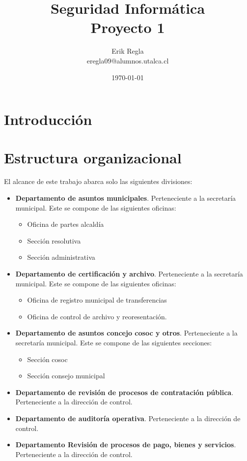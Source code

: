 \documentclass[11pt]{utalcaDoc}
\title{{\bf Seguridad Informática}\\ Proyecto 1}
\author{Erik Regla\\ eregla09@alumnos.utalca.cl}
\date{\today}
\begin{document}
\maketitle
\newpage

\section{Introducción}

\section{Estructura organizacional}
El alcance de este trabajo abarca solo las siguientes divisiones:
\begin{itemize}
	\item {
		\textbf{Departamento de asuntos municipales}. Perteneciente a la secretaría municipal. Este se compone de las siguientes oficinas:
		\begin{itemize}
			\item Oficina de partes alcaldía
			\item Sección resolutiva
			\item Sección administrativa
		\end{itemize}
	}
	\item {
		\textbf{Departamento de certificación y archivo}.  Perteneciente a la secretaría municipal. Este se compone de las siguientes oficinas:
		\begin{itemize}
			\item Oficina de registro municipal de transferencias
			\item Oficina de control de archivo y reoresentación.
		\end{itemize}
	}
	\item {
		\textbf{Departamento de asuntos concejo cosoc y otros}.  Perteneciente a la secretaría municipal. Este se compone de las siguientes secciones:
		\begin{itemize}
			\item Sección cosoc
			\item Sección consejo municipal
		\end{itemize}
	}
	\item {
		\textbf{Departamento de revisión de procesos de contratación pública}.   Perteneciente a la dirección de control.
	}
	\item {
		\textbf{Departamento de auditoría operativa}.  Perteneciente a la dirección de control.
	}
	\item {
		\textbf{Departamento Revisión de procesos de pago, bienes y servicios}.  Perteneciente a la dirección de control. 
	}
\end{itemize}
\end{document}
